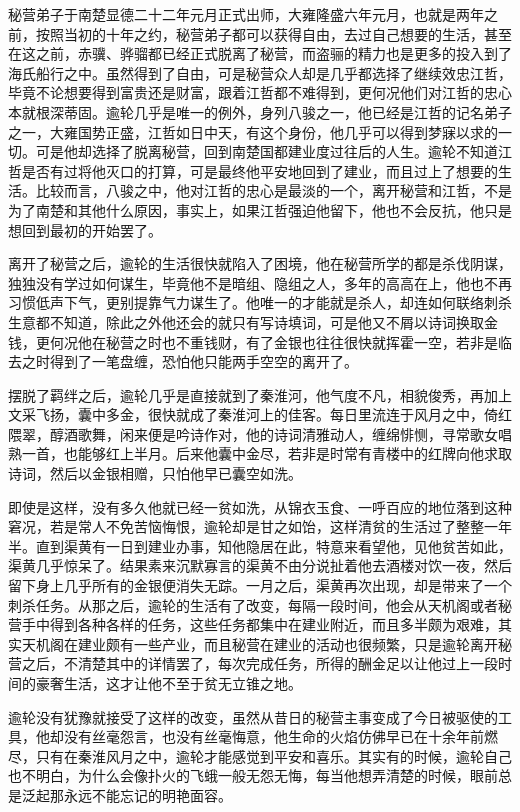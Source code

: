 秘营弟子于南楚显德二十二年元月正式出师，大雍隆盛六年元月，也就是两年之前，按照当初的十年之约，秘营弟子都可以获得自由，去过自己想要的生活，甚至在这之前，赤骥、骅骝都已经正式脱离了秘营，而盗骊的精力也是更多的投入到了海氏船行之中。虽然得到了自由，可是秘营众人却是几乎都选择了继续效忠江哲，毕竟不论想要得到富贵还是财富，跟着江哲都不难得到，更何况他们对江哲的忠心本就根深蒂固。逾轮几乎是唯一的例外，身列八骏之一，他已经是江哲的记名弟子之一，大雍国势正盛，江哲如日中天，有这个身份，他几乎可以得到梦寐以求的一切。可是他却选择了脱离秘营，回到南楚国都建业度过往后的人生。逾轮不知道江哲是否有过将他灭口的打算，可是最终他平安地回到了建业，而且过上了想要的生活。比较而言，八骏之中，他对江哲的忠心是最淡的一个，离开秘营和江哲，不是为了南楚和其他什么原因，事实上，如果江哲强迫他留下，他也不会反抗，他只是想回到最初的开始罢了。

离开了秘营之后，逾轮的生活很快就陷入了困境，他在秘营所学的都是杀伐阴谋，独独没有学过如何谋生，毕竟他不是暗组、隐组之人，多年的高高在上，他也不再习惯低声下气，更别提靠气力谋生了。他唯一的才能就是杀人，却连如何联络刺杀生意都不知道，除此之外他还会的就只有写诗填词，可是他又不屑以诗词换取金钱，更何况他在秘营之时也不重钱财，有了金银也往往很快就挥霍一空，若非是临去之时得到了一笔盘缠，恐怕他只能两手空空的离开了。

摆脱了羁绊之后，逾轮几乎是直接就到了秦淮河，他气度不凡，相貌俊秀，再加上文采飞扬，囊中多金，很快就成了秦淮河上的佳客。每日里流连于风月之中，倚红隈翠，醇酒歌舞，闲来便是吟诗作对，他的诗词清雅动人，缠绵悱恻，寻常歌女唱熟一首，也能够红上半月。后来他囊中金尽，若非是时常有青楼中的红牌向他求取诗词，然后以金银相赠，只怕他早已囊空如洗。

即使是这样，没有多久他就已经一贫如洗，从锦衣玉食、一呼百应的地位落到这种窘况，若是常人不免苦恼悔恨，逾轮却是甘之如饴，这样清贫的生活过了整整一年半。直到渠黄有一日到建业办事，知他隐居在此，特意来看望他，见他贫苦如此，渠黄几乎惊呆了。结果素来沉默寡言的渠黄不由分说扯着他去酒楼对饮一夜，然后留下身上几乎所有的金银便消失无踪。一月之后，渠黄再次出现，却是带来了一个刺杀任务。从那之后，逾轮的生活有了改变，每隔一段时间，他会从天机阁或者秘营手中得到各种各样的任务，这些任务都集中在建业附近，而且多半颇为艰难，其实天机阁在建业颇有一些产业，而且秘营在建业的活动也很频繁，只是逾轮离开秘营之后，不清楚其中的详情罢了，每次完成任务，所得的酬金足以让他过上一段时间的豪奢生活，这才让他不至于贫无立锥之地。

逾轮没有犹豫就接受了这样的改变，虽然从昔日的秘营主事变成了今日被驱使的工具，他却没有丝毫怨言，也没有丝毫悔意，他生命的火焰仿佛早已在十余年前燃尽，只有在秦淮风月之中，逾轮才能感觉到平安和喜乐。其实有的时候，逾轮自己也不明白，为什么会像扑火的飞蛾一般无怨无悔，每当他想弄清楚的时候，眼前总是泛起那永远不能忘记的明艳面容。


